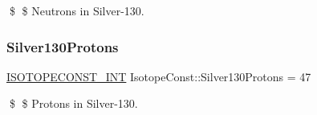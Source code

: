 \$ \$ Neutrons in Silver-\/130. \mbox{\label{group___isotope_const-_silver-_ag130_gaaaaceaac1d24875aa15b36acd4f4a268}} 
\subsubsection{\texorpdfstring{Silver130\+Protons}{Silver130Protons}}
{\footnotesize\ttfamily \mbox{\hyperlink{group___isotope_const-_macros_ga5f18360b3e99483a35c32d789e62621c}{I\+S\+O\+T\+O\+P\+E\+C\+O\+N\+S\+T\+\_\+\+I\+NT}} Isotope\+Const\+::\+Silver130\+Protons = 47}

\$ \$ Protons in Silver-\/130. 